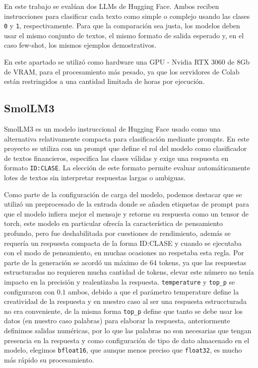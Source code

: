 \documentclass[12pt]{article}
\newcommand{\claseSimple}{\texttt{0}}
\newcommand{\claseCompleja}{\texttt{1}}
\begin{document}
En este trabajo se evalúan dos LLMs de Hugging Face. Ambos reciben instrucciones para clasificar cada texto como simple o complejo usando las clases \claseSimple{} y \claseCompleja{}, respectivamente. Para que la comparación sea justa, los modelos deben usar el mismo conjunto de textos, el mismo formato de salida esperado y, en el caso few-shot, los mismos ejemplos demostrativos.

En este apartado se utilizó como hardware una GPU - Nvidia RTX 3060 de 8Gb de VRAM, para el procesamiento más pesado, ya que los servidores de Colab están restringidos a una cantidad limitada de horas por ejecución.

\subsection{SmolLM3}

SmolLM3 es un modelo instruccional de Hugging Face usado como una alternativa relativamente compacta para clasificación mediante prompts. En este proyecto se utiliza con un prompt que define el rol del modelo como clasificador de textos financieros, especifica las clases válidas y exige una respuesta en formato \texttt{ID:CLASE}. La elección de este formato permite evaluar automáticamente lotes de textos sin interpretar respuestas largas o ambiguas.

Como parte de la configuración de carga del modelo, podemos destacar que se utilizó un preprocesado de la entrada donde se añaden etiquetas de prompt para que el modelo infiera mejor el mensaje y retorne su respuesta como un tensor de torch, este modelo en particular ofrecía la característica de pensamiento profundo, pero fue deshabilitada por cuestiones de rendimiento, además se requería un respuesta compacta de la forma ID:CLASE y cuando se ejecutaba con el modo de pensamiento, en muchas ocasiones no respetaba esta regla. Por parte de la generación se acordó un máximo de 64 tokens, ya que las respuestas estructuradas no requieren mucha cantidad de tokens, elevar este número no tenía impacto en la precisión y realentizaba la respuesta. \texttt{temperature} y \texttt{top\_p} se configuraron con $0.1$ ambos, debido a que el parámetro temperature define la creatividad de la respuesta y en nuestro caso al ser una respuesta estruccturada no era conveniente, de la misma forma \texttt{top\_p} define que tanto se debe usar los datos (en nuestro caso palabras) para elaborar la respuesta, anteriormente definimos salidas numéricas, por lo que las palabras no son necesarias que tengan presencia en la respuesta y como configuración de tipo de dato almacenado en el modelo, elegimos \texttt{bfloat16}, que aunque menos preciso que \texttt{float32}, es mucho más rápido su procesamiento.
\end{document}
